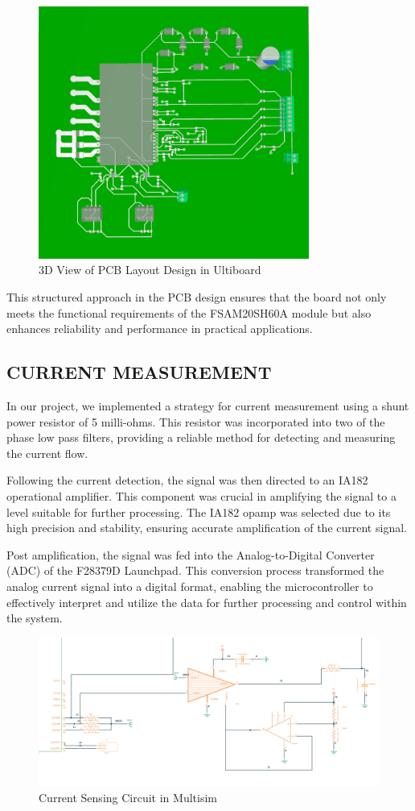\begin{figure}[H]
	\centering
	\includegraphics[width=3.5in]{sections/section4/images/PCBDesign/Ultiboard/3DTopView.png}
	\caption{3D View of PCB Layout Design in Ultiboard}
\end{figure}

This structured approach in the PCB design ensures that the board not only meets the functional requirements of the FSAM20SH60A module but also enhances reliability and performance in practical applications.

\subsection{CURRENT MEASUREMENT}

In our project, we implemented a strategy for current measurement using a shunt power resistor of 5 milli-ohms. This resistor was incorporated into two of the phase low pass filters, providing a reliable method for detecting and measuring the current flow.

Following the current detection, the signal was then directed to an IA182 operational amplifier. This component was crucial in amplifying the signal to a level suitable for further processing. The IA182 opamp was selected due to its high precision and stability, ensuring accurate amplification of the current signal.

Post amplification, the signal was fed into the Analog-to-Digital Converter (ADC) of the F28379D Launchpad. This conversion process transformed the analog current signal into a digital format, enabling the microcontroller to effectively interpret and utilize the data for further processing and control within the system. 



\begin{figure}[H]
	\centering
	\includegraphics[width=6in]{sections/section4/images/PCBDesign/Multisim/MultisimCurrentSensing.png}
	\caption{Current Sensing Circuit in Multisim}
\end{figure}



\newpage